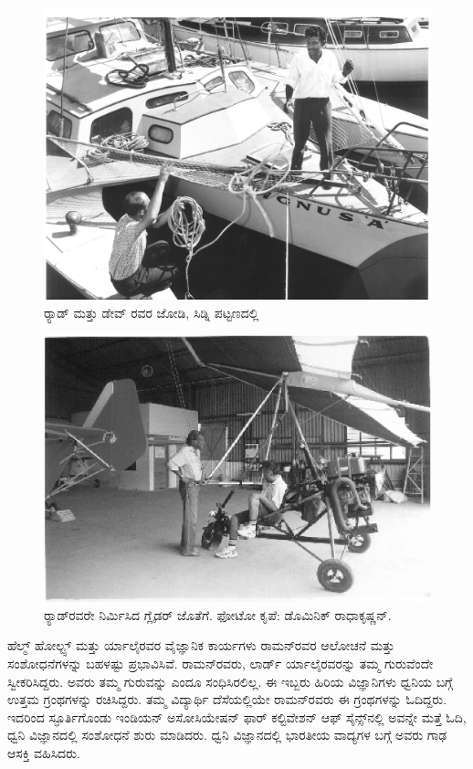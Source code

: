 \begin{figure}
\includegraphics{"images/20.jpg"}
\caption{ರ‍್ಯಾಡ್ ಮತ್ತು ಡೇವ್ ರವರ ಜೋಡಿ, ಸಿಡ್ನಿ ಪಟ್ಟಣದಲ್ಲಿ }
\end{figure}


\begin{figure}
\includegraphics{"images/21.jpg"}
\caption{ರ‍್ಯಾಡ್‍ರವರೇ ನಿರ್ಮಿಸಿದ ಗ್ಲೈಡರ್ ಜೊತೆಗೆ. ಫೋಟೋ ಕೃಪೆ: ಡೊಮಿನಿಕ್ ರಾಧಾಕೃಷ್ಣನ್.}
\end{figure}



ಹೆಲ್ಮ್ ‍ಹೋಲ್ಟ್ಸ್ ಮತ್ತು ರ್ಯಾಲೈರವರ ವೈಜ್ಞಾನಿಕ ಕಾರ್ಯಗಳು ರಾಮನ್‍ರವರ ಆಲೋಚನೆ ಮತ್ತು ಸಂಶೋಧನೆಗಳನ್ನು ಬಹಳಷ್ಟು ಪ್ರಭಾವಿಸಿವೆ. ರಾಮನ್‍ರವರು, ಲಾರ್ಡ್ ರ್ಯಾಲೈರವರನ್ನು ತಮ್ಮ ಗುರುವೆಂದೇ ಸ್ವೀಕರಿಸಿದ್ದರು. ಅವರು ತಮ್ಮ ಗುರುವನ್ನು ಎಂದೂ ಸಂಧಿಸಿರಲಿಲ್ಲ. ಈ ಇಬ್ಬರು ಹಿರಿಯ ವಿಜ್ಞಾನಿಗಳು ಧ್ವನಿಯ ಬಗ್ಗೆ ಉತ್ತಮ ಗ್ರಂಥಗಳನ್ನು ರಚಿಸಿದ್ದರು. ತಮ್ಮ ವಿದ್ಯಾರ್ಥಿ ದೆಸೆಯಲ್ಲಿಯೇ ರಾಮನ್‍ರವರು ಈ ಗ್ರಂಥಗಳನ್ನು ಓದಿದ್ದರು. ಇದರಿಂದ ಸ್ಫೂರ್ತಿಗೊಂಡು ಇಂಡಿಯನ್ ಅಸೋಸಿಯೇಷನ್ ಫಾರ್ ಕಲ್ಟಿವೇಶನ್ ಆಫ್ ಸೈನ್ಸ್‌ನಲ್ಲಿ ಅವನ್ನೇ ಮತ್ತೆ ಓದಿ, ಧ್ವನಿ ವಿಜ್ಞಾನದಲ್ಲಿ ಸಂಶೋಧನೆ ಶುರು ಮಾಡಿದರು. ಧ್ವನಿ ವಿಜ್ಞಾನದಲ್ಲಿ ಭಾರತೀಯ ವಾದ್ಯಗಳ ಬಗ್ಗೆ ಅವರು ಗಾಢ ಆಸಕ್ತಿ ವಹಿಸಿದರು.

